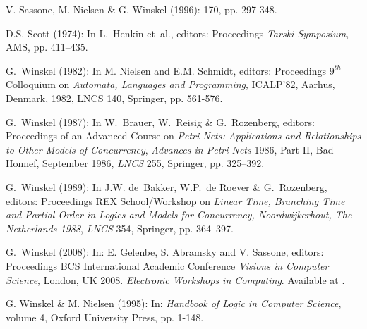 \documentclass[twocolumn]{article}
\begin{document}
\begin{thebibliography}{10}
{\sc V. Sassone, M. Nielsen \& G. Winskel} (1996):
 170, pp. 297-348.

{\sc D.S. Scott} (1974):
\newblock In L.~Henkin et~al., editors: {Proceedings \sl Tarski Symposium}, AMS, pp. 411--435.

{\sc G.~Winskel} (1982):
\newblock In M. Nielsen and E.M. Schmidt, editors: Proceedings
$9^{th}$ Colloquium on {\sl Automata, Languages and Programming},
ICALP'82, Aarhus, Denmark, 1982, LNCS 140, Springer, pp. 561-576.

{\sc G.~Winskel} (1987):
\newblock In W.~Brauer, W.~Reisig \& G.~Rozenberg, editors: Proceedings of an Advanced
Course on {\sl Petri Nets: Applications and Relationships to Other
Models of Concurrency}, {\sl Advances in Petri Nets} 1986, Part II, {\rm Bad
Honnef, September 1986}, {\sl \rm LNCS} 255, Springer, pp. 325--392.

{\sc G.~Winskel} (1989):
\newblock In J.W. de~Bakker, W.P.~de Roever \& G.~Rozenberg, editors:
{Proceedings REX School/Workshop on \sl Linear Time, Branching Time and Partial Order
in Logics and Models for Concurrency, {\rm Noordwijkerhout, The
Netherlands 1988}}, {\sl \rm LNCS} 354, Springer, pp. 364--397.

{\sc G.~Winskel} (2008):
\newblock In: E. Gelenbe, S. Abramsky and V. Sassone, editors:
 Proceedings BCS International Academic Conference {\sl Visions in Computer
Science}, London, UK 2008. {\sl Electronic Workshops in Computing}.
\newblock Available at .

{\sc G. Winskel \& M. Nielsen} (1995):
\newblock In: {\sl Handbook of Logic in Computer Science}, volume 4,
Oxford University Press, pp. 1-148.

\end{thebibliography}

\printindex
\end{document}
